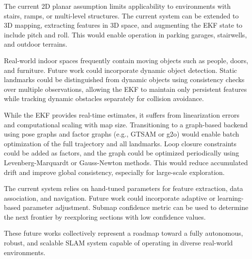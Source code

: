 \documentclass[11pt]{article}
\begin{document}
The current 2D planar assumption limits applicability to environments with stairs, ramps, or multi-level structures. The current system can be extended to 3D mapping, extracting features in 3D space, and augmenting the EKF state to include pitch and roll. This would enable operation in parking garages, stairwells, and outdoor terrains.

Real-world indoor spaces frequently contain moving objects such as people, doors, and furniture. Future work could incorporate dynamic object detection. Static landmarks could be distinguished from dynamic objects using consistency checks over multiple observations, allowing the EKF to maintain only persistent features while tracking dynamic obstacles separately for collision avoidance.

While the EKF provides real-time estimates, it suffers from linearization errors and computational scaling with map size. Transitioning to a graph-based backend using pose graphs and factor graphs (e.g., GTSAM or g2o) would enable batch optimization of the full trajectory and all landmarks. Loop closure constraints could be added as factors, and the graph could be optimized periodically using Levenberg-Marquardt or Gauss-Newton methods. This would reduce accumulated drift and improve global consistency, especially for large-scale exploration.

The current system relies on hand-tuned parameters for feature extraction, data association, and navigation. Future work could incorporate adaptive or learning-based parameter adjustment. Submap confidence metric can be used to determine the next frontier by reexploring sections with low confidence values.

These future works collectively represent a roadmap toward a fully autonomous, robust, and scalable SLAM system capable of operating in diverse real-world environments.
\end{document}

